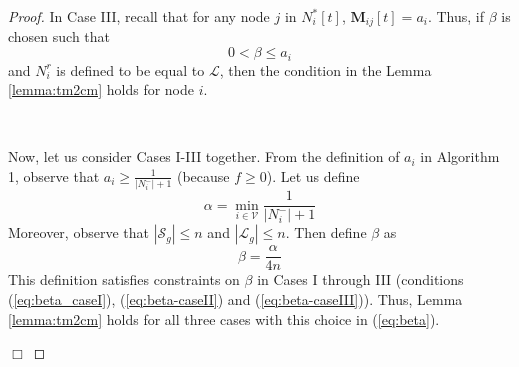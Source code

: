 \documentclass{llncs}
\newcommand{\fillbox}{\hspace*{\fill}\(\Box\)}
\newcommand{\scriptv}{\mathcal{V}}
\newcommand{\scriptl}{\mathcal{L}}
\newcommand{\scripts}{\mathcal{S}}
\newcommand{\matrixm}{\textbf{M}}
\begin{document}
\begin{proof}
In Case III, recall that for any node $j$ in $N_i^*[t]$, $\matrixm_{ij}[t] = a_i$.
Thus, if $\beta$ is chosen such that
\begin{equation}
\label{eq:beta-caseIII}
0 < \beta \leq a_i
\end{equation}
and $N_i^r$ is defined to be equal to $\scriptl$,
then the condition in the
Lemma \ref{lemma:tm2cm} holds for node $i$. 

~



Now, let us consider Cases I-III together. From the definition of $a_i$ in Algorithm 1, observe that $a_i \geq \frac{1}{|N_i^-|+1}$ (because $f\geq 0$). Let us define
\[ \alpha = \min_{i\in\scriptv} \frac{1}{|N_i^-|+1}\]
Moreover, observe that $|\scripts_g| \leq n$ and $|\scriptl_g| \leq n$. Then define $\beta$ as 
\begin{equation}
\label{eq:beta}
\beta = \frac{\alpha}{4n}
\end{equation}
This definition satisfies constraints on $\beta$ in Cases I through III (conditions (\ref{eq:beta_caseI}), (\ref{eq:beta-caseII}) and (\ref{eq:beta-caseIII})). Thus, Lemma \ref{lemma:tm2cm} holds for all three cases with this choice in (\ref{eq:beta}).

\fillbox
\end{proof}
\end{document}
